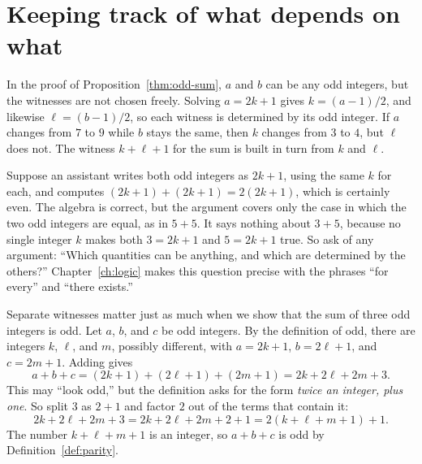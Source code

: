 \section{Keeping track of what depends on what}\label{ch01:sec:dependence}
In the proof of Proposition~\ref{thm:odd-sum}, $a$ and $b$ can be any odd integers, but the witnesses are not chosen freely. Solving $a=2k+1$ gives $k=(a-1)/2$, and likewise $\ell=(b-1)/2$, so each witness is determined by its odd integer. If $a$ changes from $7$ to $9$ while $b$ stays the same, then $k$ changes from $3$ to $4$, but $\ell$ does not. The witness $k+\ell+1$ for the sum is built in turn from $k$ and $\ell$.

Suppose an assistant writes both odd integers as $2k+1$, using the same $k$ for each, and computes $(2k+1)+(2k+1)=2(2k+1)$, which is certainly even. The algebra is correct, but the argument covers only the case in which the two odd integers are equal, as in $5+5$. It says nothing about $3+5$, because no single integer $k$ makes both $3=2k+1$ and $5=2k+1$ true. So ask of any argument: ``Which quantities can be anything, and which are determined by the others?'' Chapter~\ref{ch:logic} makes this question precise with the phrases ``for every'' and ``there exists.''

Separate witnesses matter just as much when we show that the sum of three odd integers is odd. Let $a$, $b$, and $c$ be odd integers. By the definition of odd, there are integers $k$, $\ell$, and $m$, possibly different, with $a=2k+1$, $b=2\ell+1$, and $c=2m+1$. Adding gives
\[
a+b+c=(2k+1)+(2\ell+1)+(2m+1)=2k+2\ell+2m+3.
\]
This may ``look odd,'' but the definition asks for the form \emph{twice an integer, plus one}. So split $3$ as $2+1$ and factor $2$ out of the terms that contain it:
\[
2k+2\ell+2m+3=2k+2\ell+2m+2+1=2(k+\ell+m+1)+1.
\]
The number $k+\ell+m+1$ is an integer, so $a+b+c$ is odd by Definition~\ref{def:parity}.
